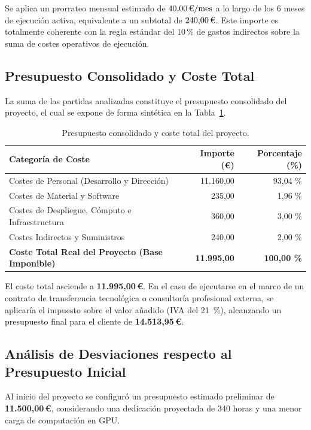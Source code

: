 Se aplica un prorrateo mensual estimado de $40{,}00\,\text{\euro}/\text{mes}$ a lo largo de los 6 meses de ejecución activa, equivalente a un subtotal de $240{,}00\,\text{\euro}$. Este importe es totalmente coherente con la regla estándar del 10\,\% de gastos indirectos sobre la suma de costes operativos de ejecución.

\subsection{Presupuesto Consolidado y Coste Total}
La suma de las partidas analizadas constituye el presupuesto consolidado del proyecto, el cual se expone de forma sintética en la Tabla~\ref{tab:presupuesto_total}.

\begin{table}[htbp]
\centering
\caption{Presupuesto consolidado y coste total del proyecto.}
\label{tab:presupuesto_total}
\begin{tabularx}{\linewidth}{@{}Xrr@{}}
\toprule
\textbf{Categoría de Coste} & \textbf{Importe (\euro)} & \textbf{Porcentaje (\%)} \\
\midrule
Costes de Personal (Desarrollo y Dirección) & 11.160,00 & 93,04 \% \\
Costes de Material y Software & 235,00 & 1,96 \% \\
Costes de Despliegue, Cómputo e Infraestructura & 360,00 & 3,00 \% \\
Costes Indirectos y Suministros & 240,00 & 2,00 \% \\
\midrule
\textbf{Coste Total Real del Proyecto (Base Imponible)} & \textbf{11.995,00} & \textbf{100,00 \%} \\
\bottomrule
\end{tabularx}
\end{table}

El coste total asciende a \textbf{11.995,00\,\euro}. En el caso de ejecutarse en el marco de un contrato de transferencia tecnológica o consultoría profesional externa, se aplicaría el impuesto sobre el valor añadido (IVA del 21~\%), alcanzando un presupuesto final para el cliente de \textbf{14.513,95\,\euro}.

\subsection{Análisis de Desviaciones respecto al Presupuesto Inicial}
Al inicio del proyecto se configuró un presupuesto estimado preliminar de \textbf{11.500,00\,\euro}, considerando una dedicación proyectada de 340 horas y una menor carga de computación en GPU.


